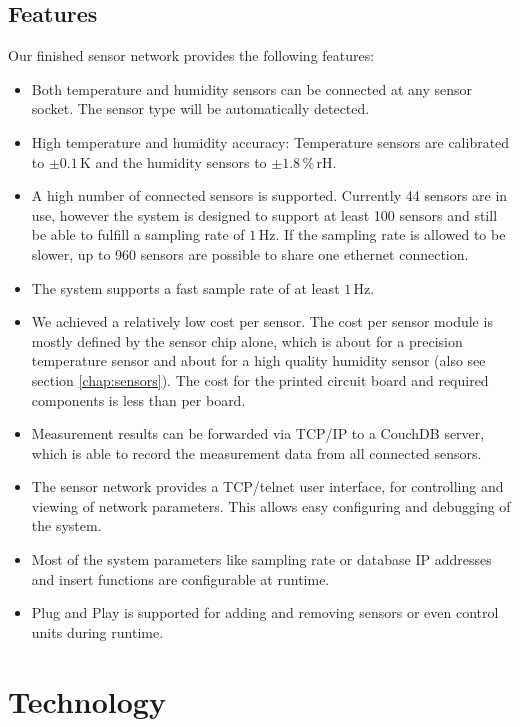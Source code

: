 \documentclass[a4paper]{scrreprt}
\begin{document}
\section{Features}
Our finished sensor network provides the following features:
\begin{itemize}
  \item Both temperature and humidity sensors can be connected at any
    sensor socket. The sensor type will be automatically detected.
  \item High temperature and humidity accuracy: Temperature sensors
    are calibrated to $\pm 0.1\,\mathrm{K}$ and the humidity
    sensors to $\pm 1.8\,\%\,\mathrm{rH}$.
  \item A high number of connected sensors is supported.
    Currently 44 sensors are in use, however the system is designed
    to support at least 100 sensors and still be able to fulfill a
    sampling rate of $1\,\mathrm{Hz}$. If the sampling rate is
    allowed to be slower, up to 960 sensors are possible to share
    one ethernet connection.
  \item The system supports a fast sample rate of at least $1\,\mathrm{Hz}$.
  \item We achieved a relatively low cost per sensor. The cost per
    sensor module is mostly
    defined by the sensor chip alone, which is about  for a
    precision temperature sensor and about  for a high quality
    humidity sensor (also see section \ref{chap:sensors}). The cost for
    the printed circuit board and required components is less than
     per board.
  \item Measurement results can be forwarded via TCP/IP to a CouchDB
    server, which is able to record the measurement data from all
    connected sensors.
  \item The sensor network provides a TCP/telnet user interface, for
    controlling and viewing of network parameters. This allows easy configuring
    and debugging of the system.
  \item Most of the system parameters like sampling rate or database IP addresses
    and insert functions are configurable at runtime.
  \item Plug and Play is supported for adding and removing sensors or even
    control units during runtime.
\end{itemize}
\chapter{Technology}
\end{document}
